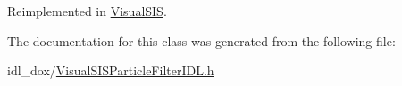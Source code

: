Reimplemented in \hyperlink{classVisualSIS_a703f84794cd66eb82040d2590b62f094}{Visual\+S\+IS}.



The documentation for this class was generated from the following file\+:\begin{DoxyCompactItemize}
\item 
idl\+\_\+dox/\hyperlink{VisualSISParticleFilterIDL_8h}{Visual\+S\+I\+S\+Particle\+Filter\+I\+D\+L.\+h}\end{DoxyCompactItemize}
